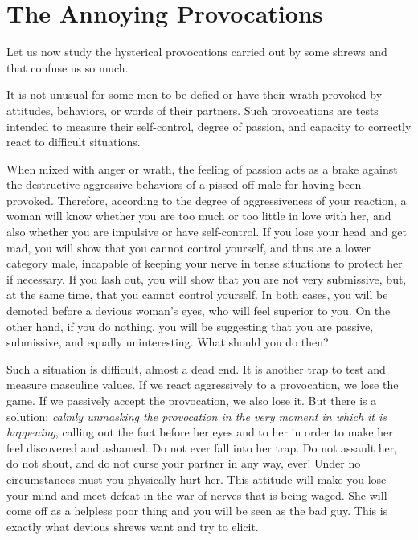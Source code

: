 \section{The Annoying Provocations}

\par Let us now study the hysterical provocations carried out by some shrews and that confuse us so much.

\par It is not unusual for some men to be defied or have their wrath provoked by attitudes, behaviors, or words of their partners. Such provocations are tests intended to measure their self-control, degree of passion, and capacity to correctly react to difficult situations.

\par When mixed with anger or wrath, the feeling of passion acts as a brake against the destructive aggressive behaviors of a pissed-off male for having been provoked. Therefore, according to the degree of aggressiveness of your reaction, a woman will know whether you are too much or too little in love with her, and also whether you are impulsive or have self-control. If you lose your head and get mad, you will show that you cannot control yourself, and thus are a lower category male, incapable of keeping your nerve in tense situations to protect her if necessary. If you lash out, you will show that you are not very submissive, but, at the same time, that you cannot control yourself. In both cases, you will be demoted before a devious woman's eyes, who will feel superior to you. On the other hand, if you do nothing, you will be suggesting that you are passive, submissive, and equally uninteresting. What should you do then?

\par Such a situation is difficult, almost a dead end. It is another trap to test and measure masculine values. If we react aggressively to a provocation, we lose the game. If we passively accept the provocation, we also lose it. But there is a solution: \textit{calmly unmasking the provocation in the very moment in which it is happening}, calling out the fact before her eyes and to her in order to make her feel discovered and ashamed. Do not ever fall into her trap. Do not assault her, do not shout, and do not curse your partner in any way, ever! Under no circumstances must you physically hurt her. This attitude will make you lose your mind and meet defeat in the war of nerves that is being waged. She will come off as a helpless poor thing and you will be seen as the bad guy. This is exactly what devious shrews want and try to elicit.

